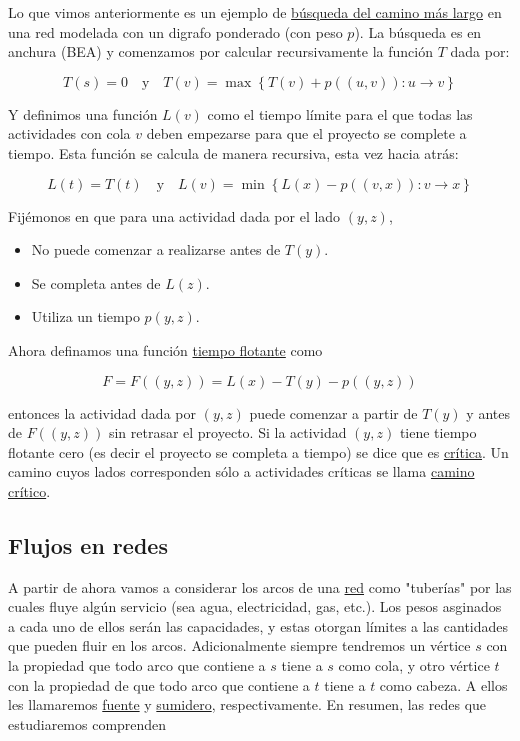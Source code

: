 Lo que vimos anteriormente es un ejemplo de \ul{búsqueda del camino más largo} en una red modelada con un digrafo ponderado (con peso $p$). La búsqueda es en anchura (BEA) y comenzamos por calcular recursivamente la función $T$ dada por:

\[
T(s) = 0 \quad \text{y} \quad T(v) = \max\left\{T(v) + p((u,v)): u \rightarrow v\right\}
\]

Y definimos una función $L(v)$ como el tiempo límite para el que todas las actividades con cola $v$ deben empezarse para que el proyecto se complete a tiempo. Esta función se calcula de manera recursiva, esta vez hacia atrás:

\[
L(t) = T(t) \quad \text{y} \quad L(v) = \min\left\{L(x) - p((v,x)) : v \rightarrow x\right\}
\]

Fijémonos en que para una actividad dada por el lado $(y,z)$,

\begin{itemize}
    \item No puede comenzar a realizarse antes de $T(y)$.
    \item Se completa antes de $L(z)$.
    \item Utiliza un tiempo $p(y,z)$.
\end{itemize}

Ahora definamos una función \ul{tiempo flotante} como

\[
F = F((y,z)) = L(x) - T(y) - p((y,z))
\]

\noindent entonces la actividad dada por $(y,z)$ puede comenzar a partir de $T(y)$ y antes de $F((y,z))$ sin retrasar el proyecto. Si la actividad $(y,z)$ tiene tiempo flotante cero (es decir el proyecto se completa a tiempo) se dice que es \ul{crítica}. Un camino cuyos lados corresponden sólo a actividades críticas se llama \ul{camino crítico}.

\subsection{Flujos en redes}

A partir de ahora vamos a considerar los arcos de una \ul{red} como "tuberías" por las cuales fluye algún servicio (sea agua, electricidad, gas, etc.). Los pesos asginados a cada uno de ellos serán las capacidades, y estas otorgan límites a las cantidades que pueden fluir en los arcos. Adicionalmente siempre tendremos un vértice $s$ con la propiedad que todo arco que contiene a $s$ tiene a $s$ como cola, y otro vértice $t$ con la propiedad de que todo arco que contiene a $t$ tiene a $t$ como cabeza. A ellos les llamaremos \ul{fuente} y \ul{sumidero}, respectivamente. En resumen, las redes que estudiaremos comprenden

